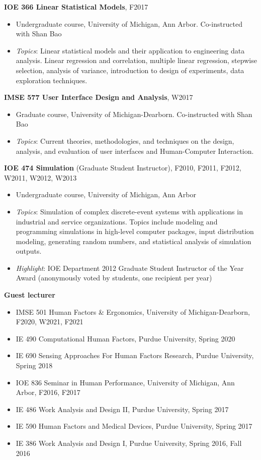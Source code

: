 \documentclass[11pt]{article}
\newenvironment{main}
{\begin{adjustwidth}{3em}{}}
{\end{adjustwidth}}
\begin{document}
\begin{main}
\textbf{IOE 366 Linear Statistical Models}, F2017

\begin{itemize}
    \item[] Undergraduate course, University of Michigan, Ann Arbor. Co-instructed with Shan Bao
    \item[] \textit{Topics}: Linear statistical models and their application to engineering data analysis. Linear regression and correlation, multiple linear regression, stepwise selection, analysis of variance, introduction to design of experiments, data exploration techniques.
\end{itemize}


\textbf{IMSE 577 User Interface Design and Analysis}, W2017

\begin{itemize}
    \item[] Graduate course, University of Michigan-Dearborn. Co-instructed with Shan Bao
    \item[] \textit{Topics}: Current theories, methodologies, and techniques on the design, analysis, and evaluation of user interfaces and Human-Computer Interaction. 
\end{itemize}


\textbf{IOE 474 Simulation} (Graduate Student Instructor), F2010, F2011, F2012, W2011, W2012, W2013

\begin{itemize}
    \item[] Undergraduate course, University of Michigan, Ann Arbor
    \item[] \textit{Topics}: Simulation of complex discrete-event systems with applications in industrial and service organizations. Topics include modeling and programming simulations in high-level computer packages, input distribution modeling, generating random numbers, and statistical analysis of simulation outputs.
    \item[] \textit{Highlight}: IOE Department 2012 Graduate Student Instructor of the Year Award (anonymously voted by students, one recipient per year)
\end{itemize}

\textbf{Guest lecturer}

\begin{itemize}
    \item IMSE 501 Human Factors \& Ergonomics, University of Michigan-Dearborn, F2020, W2021, F2021
    \item IE 490 Computational Human Factors, Purdue University, Spring 2020
    \item IE 690 Sensing Approaches For Human Factors Research, Purdue University, Spring 2018
    \item IOE 836 Seminar in Human Performance, University of Michigan, Ann Arbor, F2016, F2017
    \item IE 486 Work Analysis and Design II, Purdue University, Spring 2017
    \item IE 590 Human Factors and Medical Devices, Purdue University, Spring 2017
    \item IE 386 Work Analysis and Design I, Purdue University, Spring 2016, Fall 2016
\end{itemize}



\end{main}
\end{document}
